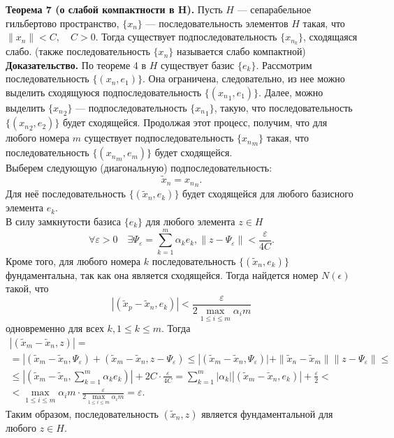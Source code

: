\documentclass[12pt,a4paper, titlepage]{article}
\begin{document}
\textbf{Теорема 7 (о слабой компактности в H).} Пусть $H$ --- сепарабельное гильбертово пространство, $\{x_n\}$ --- последовательность элементов $H$ такая, что $\|x_n\| < C,\quad C > 0$. Тогда существует подпоследовательность $\lbrace x_{n_k} \rbrace$, сходящаяся слабо. (также последовательность $\{x_n\}$ называется слабо компактной) \\
\textbf{Доказательство.} По теореме 4 в $H$ существует базис $\{e_k\}$. Рассмотрим последовательность $\{(x_n, e_1)\}$. Она ограничена, следовательно, из нее можно выделить сходящуюся подпоследовательность $\{({x_n}_1, e_1)\}$. Далее, можно выделить $\{{x_n}_2\}$ --- подпоследовательность $\{{x_n}_1\}$, такую, что последовательность $\{({x_n}_2, e_2)\}$ будет сходящейся. Продолжая этот процесс, получим, что для любого номера $m$ существует подпоследовательность $\{{x_n}_m\}$ такая, что последовательность $\{({x_n}_m, e_m)\}$ будет сходящейся.\\

Выберем следующую (диагональную) подпоследовательность:
$$
{\tilde x}_n = {x_n}_n.
$$
Для неё последовательность $\{({\tilde x}_n, e_k)\}$ будет сходящейся для любого базисного элемента $e_k$.\\

В силу замкнутости базиса $\{e_k\}$ для любого элемента $z \in H$
$$
\forall \varepsilon > 0 \quad \exists \Psi_\varepsilon = \sum_{k=1}^m \alpha_k e_k, \|z - \Psi_\varepsilon\| < \frac{\varepsilon}{4C}.
$$
Кроме того, для любого номера $k$ последовательность $\{(\tilde x_n, e_k)\}$ фундаментальна, так как она является сходящейся. Тогда найдется номер $N(\epsilon)$ такой, что 
$$
|(\tilde x_p - \tilde x_n, e_k)| < \frac{\varepsilon}{2 \max_{1 \leqslant i \leqslant m} \alpha_i m} 
$$
одновременно для всех $k, 1 \leqslant k \leqslant m$.  
Тогда
\begin{multline*}
|(\tilde x_m - \tilde x_n, z)| = \\
= |(\tilde x_m - \tilde x_n, \Psi_\varepsilon) + (\tilde x_m - \tilde x_n, z - \Psi_\varepsilon) \leqslant |(\tilde x_m - \tilde x_n, \Psi_\varepsilon)| + \|\tilde x_n - \tilde x_m\| \|z - \Psi_\varepsilon\| \leqslant \\
\leqslant |(\tilde x_m - \tilde x_n, \sum_{k=1}^m \alpha_k e_k)| + 2C \cdot \frac{\varepsilon}{4C} = \sum_{k=1}^m |\alpha_k| |(\tilde x_m - \tilde x_n, e_k)| + \frac{\varepsilon}{2} < \\
< \max_{1 \leqslant i \leqslant m} \alpha_i m \cdot \frac{\varepsilon}{2 \max\limits_{1 \leqslant i \leqslant m} \alpha_i m} = \varepsilon.
\end{multline*}
Таким образом, последовательность $(\tilde x_n, z)$ является фундаментальной для любого $z \in H$.\\
\end{document}

